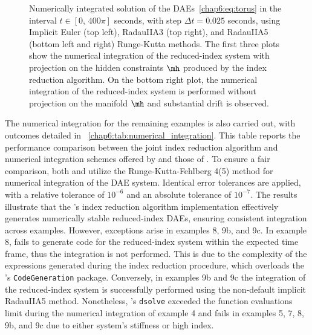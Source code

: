 \begin{figure}
  \centering
  \caption[
    Numerically integrated solution of the \acp{DAE}~\eqref{chap6:eq:torus} using Implicit Euler, RadauIIA3, and RadauIIA5 Runge-Kutta methods.
  ]{
    Numerically integrated solution of the \acp{DAE}~\eqref{chap6:eq:torus} in the interval $t \in [0, \, 400\pi]$ seconds, with step $\Delta t = 0.025$ seconds, using Implicit Euler (top left), RadauIIA3 (top right), and RadauIIA5 (bottom left and right) Runge-Kutta methods. The first three plots show the numerical integration of the reduced-index system with projection on the hidden constraints $\mh$ produced by the index reduction algorithm. On the bottom right plot, the numerical integration of the reduced-index system is performed without projection on the manifold $\mh$ and substantial drift is observed.
  }
  \label{chap6:fig:torus_integration}
\end{figure}

The numerical integration for the remaining examples is also carried out, with outcomes detailed in \tablename{}~\ref{chap6:tab:numerical_integration}. This table reports the performance comparison between the joint index reduction algorithm and numerical integration schemes offered by \Maple{} and those of \Indigo{}. To ensure a fair comparison, both \Maple{} and \Indigo{} utilize the Runge-Kutta-Fehlberg 4(5) method for numerical integration of the \ac{DAE} system. Identical error tolerances are applied, with a relative tolerance of $10^{-6}$ and an absolute tolerance of $10^{-7}$. The results illustrate that the \Indigo{}'s index reduction algorithm implementation effectively generates numerically stable reduced-index \acp{DAE}, ensuring consistent integration across examples. However, exceptions arise in examples 8, 9b, and 9c. In example 8, \Maple{} fails to generate code for the reduced-index system within the expected time frame, thus the integration is not performed. This is due to the complexity of the expressions generated during the index reduction procedure, which overloads the \Maple{}'s \texttt{CodeGeneration} package. Conversely, in examples 9b and 9c the integration of the reduced-index system is successfully performed using the non-default implicit RadauIIA5 method. Nonetheless, \Maple{}'s \texttt{dsolve} exceeded the function evaluations limit during the numerical integration of example 4 and fails in examples 5, 7, 8, 9b, and 9c due to either system's stiffness or high index.

